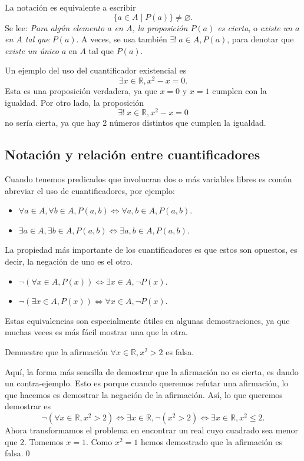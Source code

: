 \documentclass[12pt]{book}
\begin{document}
La notación  es equivalente a escribir
\[
\{a\in A\mid P(a)\}\neq \varnothing.
\]
Se lee: \textit{Para algún elemento $a$ en $A$, la proposición $P(a)$ es cierta}, o \textit{existe un $a$ en $A$ tal que $P(a)$}. A veces, se usa también $\exists! \ a\in A, P(a)$, para denotar que \textit{existe un único} $a$ en $A$ tal que $P(a)$.

\begin{exampleenv}
    Un ejemplo del uso del cuantificador existencial es
    \[
    \exists x \in \mathbb{R}, x^2-x=0.
    \]
    Esta es una proposición verdadera, ya que $x = 0$ y $x = 1$ cumplen con la igualdad.
    Por otro lado, la proposición
    \[
    \exists!\ x \in \mathbb{R}, x^2-x=0
    \]
    no sería cierta, ya que hay 2 números distintos que cumplen la igualdad.
\end{exampleenv}

\subsection{Notación y relación entre cuantificadores}
\noindent
Cuando tenemos predicados que involucran dos o más variables libres es común abreviar el uso de cuantificadores, por ejemplo:

\begin{itemize}
    \item $\forall a\in A, \forall b\in A, P(a,b) \iff \forall a,b \in A, P(a,b)$.
    \item $\exists a \in A, \exists b \in A, P(a,b) \iff \exists a,b \in A, P(a,b)$.
\end{itemize}

La propiedad más importante de los cuantificadores es que estos son opuestos, es decir, la negación de uno es el otro. 

\begin{itemize}
    \item $\neg (\forall x \in A, P(x))\iff\exists x \in A, \neg P(x)$.
    \item $\neg (\exists x\in A, P(x))\iff\forall x\in A,\neg P(x)$.
\end{itemize}

Estas equivalencias son especialmente útiles en algunas demostraciones, ya que muchas veces es más fácil mostrar una que la otra.

\begin{exampleenv}
    Demuestre que la afirmación $\forall x\in \mathbb{R}, x^2>2$ es falsa.

    Aquí, la forma más sencilla de demostrar que la afirmación no es cierta, es dando un contra-ejemplo. Esto es porque cuando queremos refutar una afirmación, lo que hacemos es demostrar la negación de la afirmación. Así, lo que queremos demostrar es
    \[
    \neg(\forall x\in \mathbb{R}, x^2>2) \iff\exists x\in \mathbb{R}, \neg (x^2 >2)\iff\exists x\in \mathbb{R}, x^2\leq 2.
    \]
    Ahora transformamos el problema en encontrar un real cuyo cuadrado sea menor que 2. Tomemos $x=1$. Como $x^2=1$ hemos demostrado que la afirmación es falsa.\qed
\end{exampleenv}
\end{document}
